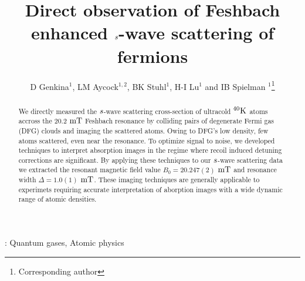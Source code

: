 \documentclass[12pt]{iopart}
\begin{document}
\newcommand{\swave}[0]{$\it{s}$-wave }
\newcommand{\pwave}[0]{$\it{p}$-wave }
\newcommand{\K}{$^{40}\rm{K}$}
\newcommand{\Rb}{$^{87}\rm{Rb}$}
\newcommand{\us}{$\rm{\mu s}$} 
\newcommand{\mT}{$\rm{mT}$}
\newcommand{\ez}{$\bf{\hat{e}_z}$}
\newcommand{\ex}{$\bf{\hat{e}_x}$}
\newcommand{\um}{$\rm{\mu m}$} 

\title[]{Direct observation of Feshbach enhanced \swave scattering of fermions}

\author{D Genkina$^1$, LM Aycock$^{1,2}$, BK Stuhl$^1$, H-I Lu$^1$ and IB Spielman
$^1$\footnote{Corresponding author}}

\address{$^1$Joint Quantum Institute, National Institute of Standards and Technology, and University of Maryland, Gaithersburg, MD, 20899 USA}
\address{$^2$Physics Department, Cornell University, Ithaca, NY 14850 USA}


\begin{abstract}
We directly measured the \swave{} scattering cross-section of ultracold \K{} atoms accross the 20.2 \mT{} Feshbach resonance by colliding pairs of degenerate Fermi gas (DFG) clouds and imaging the scattered atoms. Owing to DFG's low density, few atoms scattered, even near the resonance. To optimize signal to noise, we developed techniques to interpret absorption images in the regime where recoil induced 
detuning corrections are significant. By applying these techniques to our \swave{} scattering data we extracted the resonant magnetic
field value  $B_0 = 20.247(2)$  \mT{} and resonance width $\Delta = 1.0(1)$  \mT{}. These imaging techniques are generally applicable to experimets requiring accurate interpretation of aborption images with a wide dynamic range of atomic densities. 
\end{abstract}

\vspace{2pc}
: Quantum gases, Atomic physics

\maketitle
\end{document}
